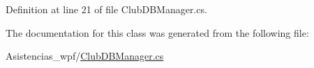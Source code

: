 Definition at line 21 of file Club\-D\-B\-Manager.\-cs.



The documentation for this class was generated from the following file\-:\begin{DoxyCompactItemize}
\item 
Asistencias\-\_\-wpf/\hyperlink{_club_d_b_manager_8cs}{Club\-D\-B\-Manager.\-cs}\end{DoxyCompactItemize}
